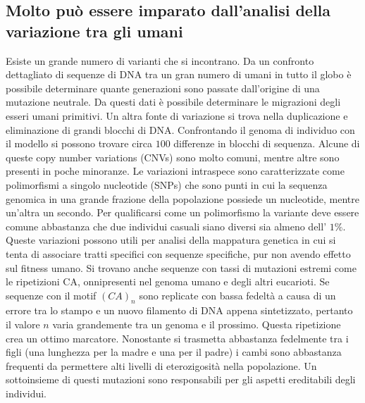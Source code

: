\subsection{Molto pu\`o essere imparato dall'analisi della variazione tra gli umani}
Esiste un grande numero di varianti che si incontrano. Da un confronto dettagliato di sequenze di DNA tra un gran numero di umani in tutto il globo \`e possibile determinare quante 
generazioni sono passate dall'origine di una mutazione neutrale. Da questi dati \`e possibile determinare le migrazioni degli esseri umani primitivi. Un altra fonte di variazione si 
trova nella duplicazione e eliminazione di grandi blocchi di DNA. Confrontando il genoma di individuo con il modello si possono trovare circa $100$ differenze in blocchi di sequenza. 
Alcune di queste copy number variations (CNVs) sono molto comuni, mentre altre sono presenti in poche minoranze. Le variazioni intraspece sono caratterizzate come polimorfismi a 
singolo nucleotide (SNPs) che sono punti in cui la sequenza genomica in una grande frazione della popolazione possiede un nucleotide, mentre un'altra un secondo. Per qualificarsi come 
un polimorfismo la variante deve essere comune abbastanza che due individui casuali siano diversi sia almeno dell' $1\%$. Queste variazioni possono utili per analisi della mappatura
genetica in cui si tenta di associare tratti specifici con sequenze specifiche, pur non avendo effetto sul fitness umano. Si trovano anche sequenze con tassi di mutazioni estremi come
le ripetizioni CA, onnipresenti nel genoma umano e degli altri eucarioti. Se sequenze con il motif $(CA)_n$ sono replicate con bassa fedelt\`a a causa di un errore tra lo stampo e 
un nuovo filamento di DNA appena sintetizzato, pertanto il valore $n$ varia  grandemente tra un genoma e il prossimo. Questa ripetizione crea un ottimo marcatore. Nonostante si trasmetta
abbastanza fedelmente tra i figli (una lunghezza per la madre e una per il padre) i cambi sono abbastanza frequenti da permettere alti livelli di eterozigosit\`a nella popolazione. 
Un sottoinsieme di questi mutazioni sono responsabili per gli aspetti ereditabili degli individui.
